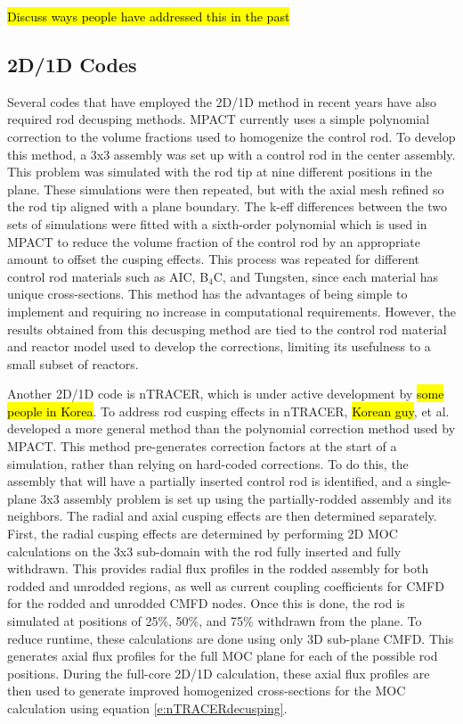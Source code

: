 \hl{Discuss ways people have addressed this in the past}

\subsection{2D/1D Codes}

Several codes that have employed the 2D/1D method in recent years have also required rod decusping methods.  MPACT currently uses a simple polynomial correction to the volume fractions used to homogenize the control rod.  To develop this method, a 3x3 assembly was set up with a control rod in the center assembly.  This problem was simulated with the rod tip at nine different positions in the plane.  These simulations were then repeated, but with the axial mesh refined so the rod tip aligned with a plane boundary.  The k-eff differences between the two sets of simulations were fitted with a sixth-order polynomial which is used in MPACT to reduce the volume fraction of the control rod by an appropriate amount to offset the cusping effects.  This process was repeated for different control rod materials such as AIC, B$_4$C, and Tungsten, since each material has unique cross-sections.  This method has the advantages of being simple to implement and requiring no increase in computational requirements.  However, the results obtained from this decusping method are tied to the control rod material and reactor model used to develop the corrections, limiting its usefulness to a small subset of reactors.

Another 2D/1D code is nTRACER, which is under active development by \hl{some people in Korea}.  To address rod cusping effects in nTRACER, \hl{Korean guy}, et al. developed a more general method than the polynomial correction method used by MPACT.  This method pre-generates correction factors at the start of a simulation, rather than relying on hard-coded corrections.  To do this, the assembly that will have a partially inserted control rod is identified, and a single-plane 3x3 assembly problem is set up using the partially-rodded assembly and its neighbors.  The radial and axial cusping effects are then determined separately.  First, the radial cusping effects are determined by performing 2D MOC calculations on the 3x3 sub-domain with the rod fully inserted and fully withdrawn.  This provides radial flux profiles in the rodded assembly for both rodded and unrodded regions, as well as current coupling coefficients for CMFD for the rodded and unrodded CMFD nodes.  Once this is done, the rod is simulated at positions of 25\%, 50\%, and 75\% withdrawn from the plane.  To reduce runtime, these calculations are done using only 3D sub-plane CMFD.  This generates axial flux profiles for the full MOC plane for each of the possible rod positions.  During the full-core 2D/1D calculation, these axial flux profiles are then used to generate improved homogenized cross-sections for the MOC calculation using equation \ref{e:nTRACERdecusping}.

